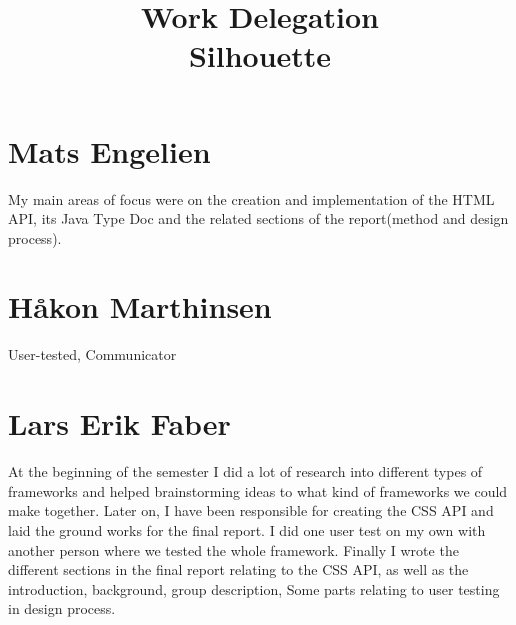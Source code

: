 \documentclass[12pt]{article}
\begin{document}
\title{%
    Work Delegation\\
    \large Silhouette}
\date{}
\maketitle

\section{Mats Engelien}

    My main areas of focus were on the creation and implementation of the HTML API, its Java Type Doc and the related sections of the report(method and design process).
    
\section{Håkon Marthinsen}

    User-tested, Communicator

\section{Lars Erik Faber}

    At the beginning of the semester I did a lot of research into different types of frameworks and helped brainstorming ideas to what kind of frameworks we could make together. Later on, I have been responsible for creating the CSS API and laid the ground works for the final report. I did one user test on my own with another person where we tested the whole framework. Finally I wrote the different sections in the final report relating to the CSS API, as well as the introduction, background, group description, Some parts relating to user testing in design process.
\end{document}
